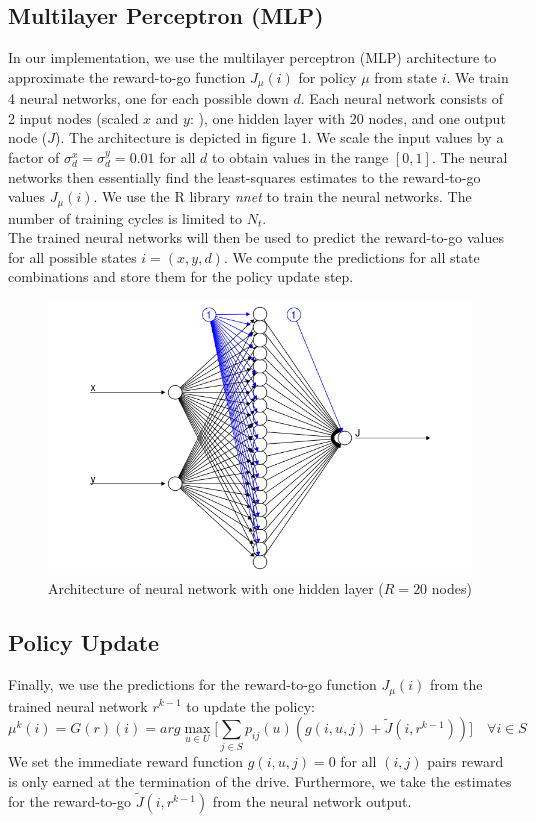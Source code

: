 \documentclass[11pt, oneside]{article}   	%
\begin{document}
\subsection{Multilayer Perceptron (MLP)}
In our implementation, we use the multilayer perceptron (MLP) architecture to approximate the reward-to-go function $J_{\mu}(i)$ for policy $\mu$ from state $i$. We train 4 neural networks, one for each possible down $d$. Each neural network consists of 2 input nodes (scaled $x$ and $y$: ), one hidden layer with 20 nodes, and one output node ($J$). The architecture is depicted in figure 1. We scale the input values by a factor of $\sigma_{d}^{x} = \sigma_{d}^{y} = 0.01$ for all $d$ to obtain values in the range $[0,1]$. The neural networks then essentially find the least-squares estimates to the reward-to-go values $J_{\mu}(i)$. We use the R library \textit{nnet} to train the neural networks. The number of training cycles is limited to $N_t$. \\

The trained neural networks will then be used to predict the reward-to-go values for all possible states $i = (x,y,d)$. We compute the predictions for all state combinations and store them for the policy update step.


\begin{figure}[ht!]
\centering
\includegraphics[width=155mm]{../images/neuralnet.png}
\caption{Architecture of neural network with one hidden layer ($R=20$ nodes)}
\end{figure}

\subsection{Policy Update}
Finally, we use the predictions for the reward-to-go function $J_{\mu}(i)$ from the trained neural network $r^{k-1}$ to update the policy:
$$
\mu^{k}(i) = G(r)(i) = arg\max\limits_{u \in U} \Big[ \sum\limits_{j \in S} p_{ij}(u)(g(i,u,j) +  \widetilde{J}(i,r^{k-1}))\Big] \quad \forall i \in S
$$
We set the immediate reward function $g(i,u,j) = 0$ for all $(i, j)$ pairs reward is only earned at the termination of the drive. Furthermore, we take the estimates for the reward-to-go $\widetilde{J}(i,r^{k-1})$ from the neural network output.\\
\end{document}
